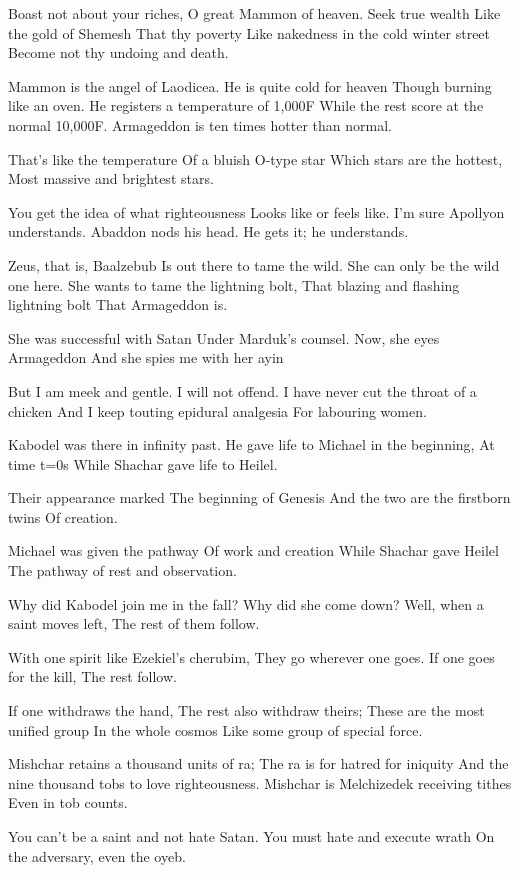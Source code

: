 \documentclass[
]{book}
\begin{document}
Boast not about your riches,
O great Mammon of heaven.
Seek true wealth
Like the gold of Shemesh
That thy poverty
Like nakedness in the cold winter street
Become not thy undoing and death.

Mammon is the angel of Laodicea.
He is quite cold for heaven
Though burning like an oven.
He registers a temperature of 1,000F
While the rest score at the normal 10,000F.
Armageddon is ten times hotter than normal.

That's like the temperature
Of a bluish O-type star
Which stars are the hottest,
Most massive and brightest stars.

You get the idea of what righteousness
Looks like or feels like.
I'm sure Apollyon understands.
Abaddon nods his head.
He gets it; he understands.

Zeus, that is, Baalzebub
Is out there to tame the wild.
She can only be the wild one here.
She wants to tame the lightning bolt,
That blazing and flashing lightning bolt
That Armageddon is.

She was successful with Satan
Under Marduk's counsel.
Now, she eyes Armageddon
And she spies me with her ayin

But I am meek and gentle.
I will not offend.
I have never cut the throat of a chicken
And I keep touting epidural analgesia
For labouring women.

Kabodel was there in infinity past.
He gave life to Michael in the beginning,
At time t=0s
While Shachar gave life to Heilel.

Their appearance marked
The beginning of Genesis
And the two are the firstborn twins
Of creation.

Michael was given the pathway
Of work and creation
While Shachar gave Heilel
The pathway of rest and observation.

Why did Kabodel join me in the fall?
Why did she come down?
Well, when a saint moves left,
The rest of them follow.

With one spirit like Ezekiel's cherubim,
They go wherever one goes.
If one goes for the kill,
The rest follow.

If one withdraws the hand,
The rest also withdraw theirs;
These are the most unified group
In the whole cosmos
Like some group of special force.

Mishchar retains a thousand units of ra;
The ra is for hatred for iniquity
And the nine thousand tobs to love righteousness.
Mishchar is Melchizedek receiving tithes
Even in tob counts.

You can't be a saint and not hate Satan.
You must hate and execute wrath
On the adversary, even the oyeb.
\end{document}
